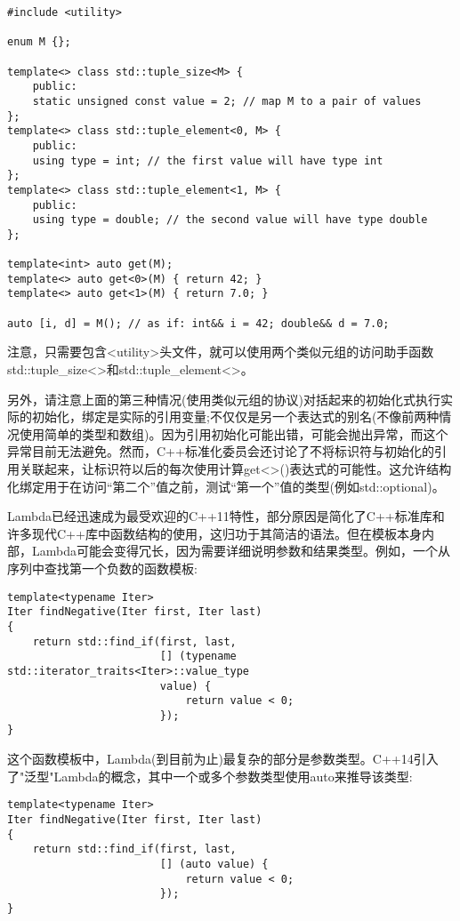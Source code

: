 \begin{enumerate}
\begin{lstlisting}[style=styleCXX]
#include <utility>

enum M {};

template<> class std::tuple_size<M> {
	public:
	static unsigned const value = 2; // map M to a pair of values
};
template<> class std::tuple_element<0, M> {
	public:
	using type = int; // the first value will have type int
};
template<> class std::tuple_element<1, M> {
	public:
	using type = double; // the second value will have type double
};

template<int> auto get(M);
template<> auto get<0>(M) { return 42; }
template<> auto get<1>(M) { return 7.0; }

auto [i, d] = M(); // as if: int&& i = 42; double&& d = 7.0;
\end{lstlisting}

\end{enumerate}

注意，只需要包含<utility>头文件，就可以使用两个类似元组的访问助手函数std::tuple\_size<>和std::tuple\_element<>。

另外，请注意上面的第三种情况(使用类似元组的协议)对括起来的初始化式执行实际的初始化，绑定是实际的引用变量;不仅仅是另一个表达式的别名(不像前两种情况使用简单的类型和数组)。因为引用初始化可能出错，可能会抛出异常，而这个异常目前无法避免。然而，C++标准化委员会还讨论了不将标识符与初始化的引用关联起来，让标识符以后的每次使用计算get<>()表达式的可能性。这允许结构化绑定用于在访问“第二个”值之前，测试“第一个”值的类型(例如std::optional)。


Lambda已经迅速成为最受欢迎的C++11特性，部分原因是简化了C++标准库和许多现代C++库中函数结构的使用，这归功于其简洁的语法。但在模板本身内部，Lambda可能会变得冗长，因为需要详细说明参数和结果类型。例如，一个从序列中查找第一个负数的函数模板:

\begin{lstlisting}[style=styleCXX]
template<typename Iter>
Iter findNegative(Iter first, Iter last)
{
	return std::find_if(first, last,
						[] (typename std::iterator_traits<Iter>::value_type
						value) {
							return value < 0;
						});
}
\end{lstlisting}

这个函数模板中，Lambda(到目前为止)最复杂的部分是参数类型。C++14引入了"泛型"Lambda的概念，其中一个或多个参数类型使用auto来推导该类型:

\begin{lstlisting}[style=styleCXX]
template<typename Iter>
Iter findNegative(Iter first, Iter last)
{
	return std::find_if(first, last,
						[] (auto value) {
							return value < 0;
						});
}
\end{lstlisting}


